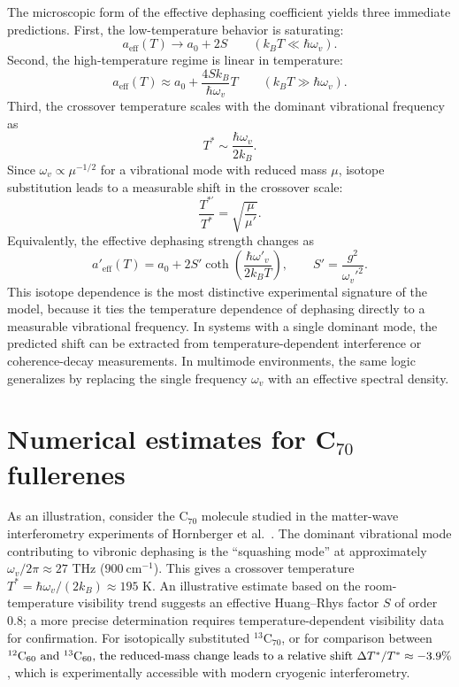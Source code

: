 \documentclass[aps,prl,twocolumn,showpacs,superscriptaddress,groupedaddress]{revtex4-2}
\begin{document}
The microscopic form of the effective dephasing coefficient yields three immediate predictions. First, the low-temperature behavior is saturating:
\[
a_{\mathrm{eff}}(T)\to a_0+2S \qquad (k_B T\ll \hbar\omega_v).
\]
Second, the high-temperature regime is linear in temperature:
\[
a_{\mathrm{eff}}(T)\approx a_0+\frac{4Sk_B}{\hbar\omega_v}T \qquad (k_B T\gg \hbar\omega_v).
\]
Third, the crossover temperature scales with the dominant vibrational frequency as
\[
T^*\sim \frac{\hbar\omega_v}{2k_B}.
\]
Since \(\omega_v\propto \mu^{-1/2}\) for a vibrational mode with reduced mass \(\mu\), isotope substitution leads to a measurable shift in the crossover scale:
\[
\frac{T^{*\prime}}{T^*}=\sqrt{\frac{\mu}{\mu'}}.
\]
Equivalently, the effective dephasing strength changes as
\[
a'_{\mathrm{eff}}(T)=a_0+2S'\coth\!\left(\frac{\hbar\omega'_v}{2k_B T}\right),\qquad S'=\frac{g^2}{\omega_v'^2}.
\]
This isotope dependence is the most distinctive experimental signature of the model, because it ties the temperature dependence of dephasing directly to a measurable vibrational frequency. In systems with a single dominant mode, the predicted shift can be extracted from temperature-dependent interference or coherence-decay measurements. In multimode environments, the same logic generalizes by replacing the single frequency \(\omega_v\) with an effective spectral density.

\section{Numerical estimates for C$_{70}$ fullerenes}

As an illustration, consider the C$_{70}$ molecule studied in the matter-wave interferometry experiments of Hornberger et al.~\cite{Hornberger2003}. The dominant vibrational mode contributing to vibronic dephasing is the ``squashing mode'' at approximately \(\omega_v/2\pi\approx 27\) THz (\(900\ \mathrm{cm^{-1}}\)). This gives a crossover temperature \(T^*=\hbar\omega_v/(2k_B)\approx 195\) K. An illustrative estimate based on the room-temperature visibility trend suggests an effective Huang–Rhys factor \(S\) of order \(0.8\); a more precise determination requires temperature-dependent visibility data for confirmation. For isotopically substituted \(^{13}\)C$_{70}$, or for comparison between \(^{12}$C$_{60}$ and \(^{13}$C$_{60}$, the reduced-mass change leads to a relative shift \(\Delta T^*/T^*\approx -3.9\%\), which is experimentally accessible with modern cryogenic interferometry.
\end{document}
